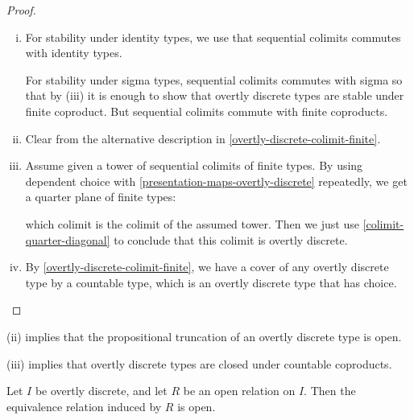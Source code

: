 \begin{proof}
\begin{enumerate}[(i)]
\item For stability under identity types, we use that sequential colimits commutes with identity types. 

For stability under sigma types, sequential colimits commutes with sigma so that by (iii) it is enough to show that overtly discrete types are stable under finite coproduct. But sequential colimits commute with finite coproducts.

\item Clear from the alternative description in \cref{overtly-discrete-colimit-finite}.

\item Assume given a tower of sequential colimits of finite types. By using dependent choice with \cref{presentation-maps-overtly-discrete} repeatedly, we get a quarter plane of finite types:
\begin{center}
\end{center}
which colimit is the colimit of the assumed tower. Then we just use \cref{colimit-quarter-diagonal} to conclude that this colimit is overtly discrete.

\item By \cref{overtly-discrete-colimit-finite}, we have a cover of any overtly discrete type by a countable type, which is an overtly discrete type that has choice.
\end{enumerate}
\end{proof}

\begin{remark}
(ii) implies that the propositional truncation of an overtly discrete type is open.

(iii) implies that overtly discrete types are closed under countable coproducts.
\end{remark}

\begin{lemma}\label{equivalence-induced-by-open-is-open}
Let $I$ be overtly discrete, and let $R$ be an open relation on $I$. Then the equivalence relation induced by $R$ is open.
\end{lemma}

